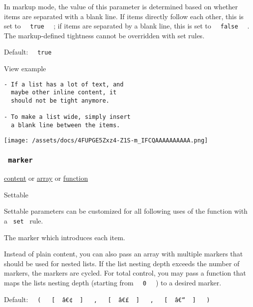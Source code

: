 In markup mode, the value of this parameter is determined based on
whether items are separated with a blank line. If items directly follow
each other, this is set to \texttt{\ }{\texttt{\ true\ }}\texttt{\ } ;
if items are separated by a blank line, this is set to
\texttt{\ }{\texttt{\ false\ }}\texttt{\ } . The markup-defined
tightness cannot be overridden with set rules.

Default: \texttt{\ }{\texttt{\ true\ }}\texttt{\ }


View example

\begin{verbatim}
- If a list has a lot of text, and
  maybe other inline content, it
  should not be tight anymore.

- To make a list wide, simply insert
  a blank line between the items.
\end{verbatim}

\texttt{[image: /assets/docs/4FUPGE5Zxz4-Z1S-m\_IFCQAAAAAAAAAA.png]}

\subsubsection{\texorpdfstring{\texttt{\ marker\ }}{ marker }}\label{parameters-marker}

\href{/docs/reference/foundations/content/}{content} {or}
\href{/docs/reference/foundations/array/}{array} {or}
\href{/docs/reference/foundations/function/}{function}

{{ Settable }}

\label{parameters-marker-settable-tooltip}
Settable parameters can be customized for all following uses of the
function with a \texttt{\ set\ } rule.

The marker which introduces each item.

Instead of plain content, you can also pass an array with multiple
markers that should be used for nested lists. If the list nesting depth
exceeds the number of markers, the markers are cycled. For total
control, you may pass a function that maps the list\textquotesingle s
nesting depth (starting from \texttt{\ }{\texttt{\ 0\ }}\texttt{\ } ) to
a desired marker.

Default:
\texttt{\ }{\texttt{\ (\ }}\texttt{\ }{\texttt{\ {[}\ }}\texttt{\ â€¢\ }{\texttt{\ {]}\ }}\texttt{\ }{\texttt{\ ,\ }}\texttt{\ }{\texttt{\ {[}\ }}\texttt{\ â€£\ }{\texttt{\ {]}\ }}\texttt{\ }{\texttt{\ ,\ }}\texttt{\ }{\texttt{\ {[}\ }}\texttt{\ â€“\ }{\texttt{\ {]}\ }}\texttt{\ }{\texttt{\ )\ }}\texttt{\ }

